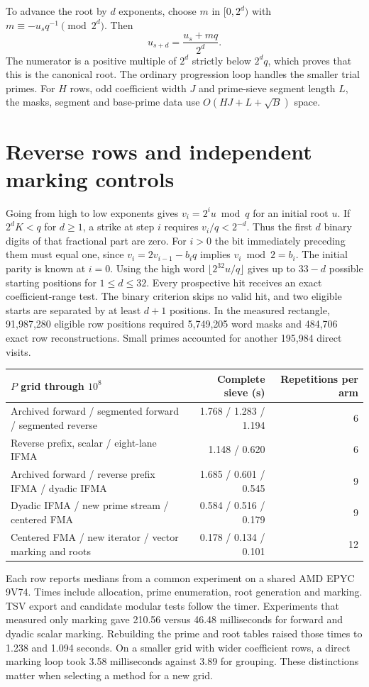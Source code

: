 \documentclass[11pt,a4paper,oneside,openany]{report}
\begin{document}
To advance the root by $d$ exponents, choose $m$ in $[0,2^d)$ with $m\equiv-u_sq^{-1}\pmod {2^d}$. Then
\[
           u_{s+d}=\frac{u_s+mq}{2^d}.
\]
The numerator is a positive multiple of $2^d$ strictly below $2^dq$, which proves that this is the canonical root. The ordinary progression loop handles the smaller trial primes. For $H$ rows, odd coefficient width $J$ and prime-sieve segment length $L$, the masks, segment and base-prime data use $O(HJ+L+\sqrt B)$ space.

\section{Reverse rows and independent marking controls}
Going from high to low exponents gives $v_i=2^iu\bmod q$ for an initial root $u$. If $2^d K<q$ for $d\ge1$, a strike at step $i$ requires $v_i/q<2^{-d}$. Thus the first $d$ binary digits of that fractional part are zero. For $i>0$ the bit immediately preceding them must equal one, since $v_i=2v_{i-1}-b_iq$ implies $v_i\bmod2=b_i$. The initial parity is known at $i=0$. Using the high word $\lfloor2^{32}u/q\rfloor$ gives up to $33-d$ possible starting positions for $1\le d\le32$. Every prospective hit receives an exact coefficient-range test. The binary criterion skips no valid hit, and two eligible starts are separated by at least $d+1$ positions. In the measured rectangle, 91,987,280 eligible row positions required 5,749,205 word masks and 484,706 exact row reconstructions. Small primes accounted for another 195,984 direct visits.

\begin{center}\small
\begin{tabular}{@{}lrr@{}}\toprule
$P$ grid through $10^8$ & Complete sieve (s) & Repetitions per arm\\\midrule
Archived forward / segmented forward / segmented reverse &1.768 / 1.283 / 1.194&6\\
Reverse prefix, scalar / eight-lane IFMA &1.148 / 0.620&6\\
Archived forward / reverse prefix IFMA / dyadic IFMA &1.685 / 0.601 / 0.545&9\\
Dyadic IFMA / new prime stream / centered FMA &0.584 / 0.516 / 0.179&9\\
Centered FMA / new iterator / vector marking and roots &0.178 / 0.134 / 0.101&12\\
\bottomrule\end{tabular}
\end{center}
Each row reports medians from a common experiment on a shared AMD EPYC 9V74. Times include allocation, prime enumeration, root generation and marking. TSV export and candidate modular tests follow the timer. Experiments that measured only marking gave 210.56 versus 46.48 milliseconds for forward and dyadic scalar marking. Rebuilding the prime and root tables raised those times to 1.238 and 1.094 seconds. On a smaller grid with wider coefficient rows, a direct marking loop took 3.58 milliseconds against 3.89 for grouping. These distinctions matter when selecting a method for a new grid.
\end{document}
